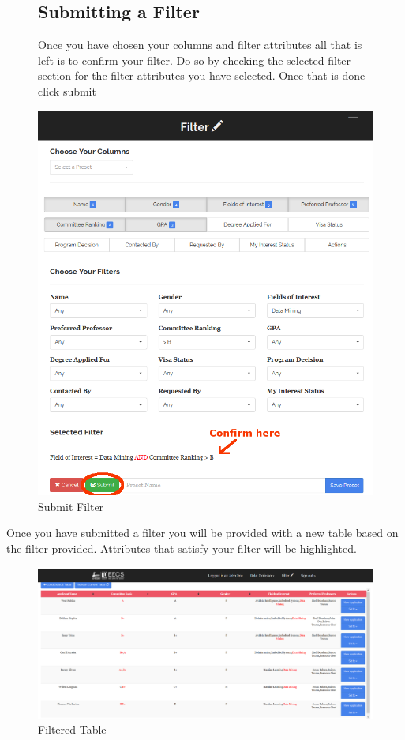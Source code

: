 \documentclass[fontsize=12pt,paper=letter,twoside]{scrartcl}
\begin{document}
\clearpage 
\begin{figure}[!htb]
\subsection{Submitting a Filter}
Once you have chosen your columns and filter attributes all that is left is to confirm your filter. Do so by checking the selected filter section for the filter attributes you have selected. Once that is done click submit
\begin{center}
\includegraphics[width=.99\textwidth]{images/submit_filter.png}
\end{center}
\caption{Submit Filter}
\label{fig:submit_filter}
\end{figure}

\clearpage
Once you have submitted a filter you will be provided with a new table based on the filter provided. Attributes that satisfy your filter will be highlighted.
\begin{figure}[!htb]
\begin{center}
\includegraphics[width=.99\textwidth]{images/filtered_table.png}
\end{center}
\caption{Filtered Table}
\label{fig:filtered_table}
\end{figure}
\end{document}
